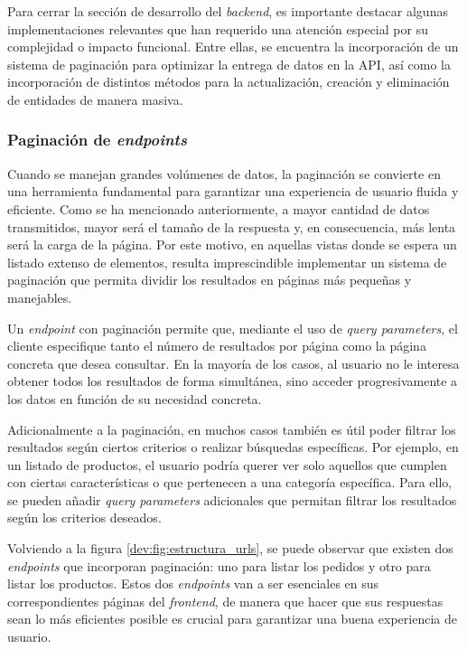 Para cerrar la sección de desarrollo del \textit{backend}, es importante destacar algunas implementaciones relevantes que han requerido una atención especial por su complejidad o impacto funcional. Entre ellas, se encuentra la incorporación de un sistema de paginación para optimizar la entrega de datos en la API, así como la incorporación de distintos métodos para la actualización, creación y eliminación de entidades de manera masiva.

\subsubsection{Paginación de \textit{endpoints}}
\label{dev:subsubsec:paginacion_endpoints}

Cuando se manejan grandes volúmenes de datos, la paginación se convierte en una herramienta fundamental para garantizar una experiencia de usuario fluida y eficiente. Como se ha mencionado anteriormente, a mayor cantidad de datos transmitidos, mayor será el tamaño de la respuesta y, en consecuencia, más lenta será la carga de la página. Por este motivo, en aquellas vistas donde se espera un listado extenso de elementos, resulta imprescindible implementar un sistema de paginación que permita dividir los resultados en páginas más pequeñas y manejables.

Un \textit{endpoint} con paginación permite que, mediante el uso de \textit{query parameters}, el cliente especifique tanto el número de resultados por página como la página concreta que desea consultar. En la mayoría de los casos, al usuario no le interesa obtener todos los resultados de forma simultánea, sino acceder progresivamente a los datos en función de su necesidad concreta.

Adicionalmente a la paginación, en muchos casos también es útil poder filtrar los resultados según ciertos criterios o realizar búsquedas específicas. Por ejemplo, en un listado de productos, el usuario podría querer ver solo aquellos que cumplen con ciertas características o que pertenecen a una categoría específica. Para ello, se pueden añadir \textit{query parameters} adicionales que permitan filtrar los resultados según los criterios deseados.

Volviendo a la figura \ref{dev:fig:estructura_urls}, se puede observar que existen dos \textit{endpoints} que incorporan paginación: uno para listar los pedidos y otro para listar los productos. Estos dos \textit{endpoints} van a ser esenciales en sus correspondientes páginas del \textit{frontend}, de manera que hacer que sus respuestas sean lo más eficientes posible es crucial para garantizar una buena experiencia de usuario.

